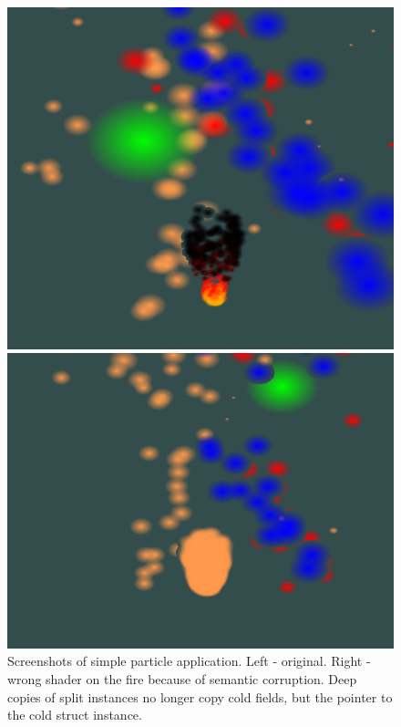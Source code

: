 \begin{figure}[ht]
	\begin{minipage}[b]{0.5\linewidth}
		\centering
		\includegraphics[width=\textwidth,height=.7\textwidth]{PICs/particles}
	\end{minipage}
	\hspace{0.5cm}
	\begin{minipage}[b]{0.5\linewidth}
		\centering
		\includegraphics[width=\textwidth,height=.7\textwidth]{PICs/particles_faulty}
	\end{minipage}
\caption{Screenshots of simple particle application. Left - original. Right - wrong shader on the fire because of semantic corruption. Deep copies of split instances no longer copy cold fields, but the pointer to the cold struct instance.}\label{particles_faulty}
\end{figure}

